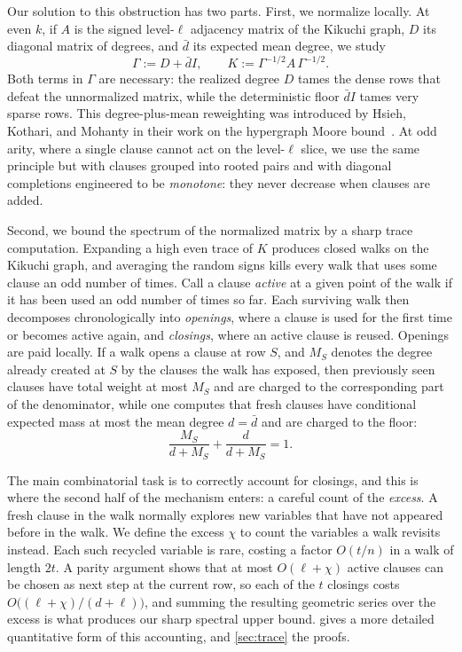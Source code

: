 \documentclass[11pt]{article}
\theoremstyle{definition}
\theoremstyle{remark}
\newcommand{\1}{\mathbf 1}
\newcommand{\bd}{\bar d}
\numberwithin{equation}{section}
\begin{document}
 Our solution to this obstruction has two
parts.  First, we normalize locally.  At even $k$, if $A$ is the signed
level-$\ell$ adjacency matrix of the Kikuchi graph, $D$ its diagonal matrix of degrees, and
$\bd$ its expected mean degree, we study
\[
 \Gamma:=D+\bd I,
 \qquad
 K:=\Gamma^{-1/2}A\,\Gamma^{-1/2}.
\]
Both terms in $\Gamma$ are necessary: the realized degree $D$ tames the
dense rows that defeat the unnormalized matrix, while the deterministic
floor $\bd I$ tames very sparse rows.  This
degree-plus-mean reweighting was introduced by Hsieh, Kothari, and
Mohanty in their work on the hypergraph Moore bound~\cite{HKM}.  At odd arity, where a single clause cannot act
on the level-$\ell$ slice, we use the same principle but with clauses
grouped into rooted pairs and with diagonal completions engineered to be
\emph{monotone}: they never decrease when clauses are added.

Second, we bound the spectrum of the normalized matrix by a sharp trace
computation.
Expanding a high even trace of $K$ produces closed walks on the Kikuchi
graph, and averaging the random signs kills every walk that uses some
clause an odd number of times.  Call a clause \emph{active} at a given
point of the walk if it has been used an odd number of times so far.
Each surviving walk then decomposes chronologically into
\emph{openings}, where a clause is used for the first time or becomes
active again, and \emph{closings}, where an active clause is reused.
Openings are paid locally.  If a walk opens a clause at row $S$, and
$M_S$ denotes the degree already created at $S$ by the clauses the walk
has exposed, then previously seen clauses have total weight at most
$M_S$ and are charged to the corresponding part of the denominator,
while one computes that fresh clauses have conditional expected mass at
most the mean degree $d=\bd$ and are charged to the floor:
\begin{equation}\label{eq:opening-identity}
 \frac{M_S}{d+M_S}+\frac{d}{d+M_S}=1.
\end{equation}

The main combinatorial task is to correctly account for closings, and this is where the second half of
the mechanism enters: a careful count of the \emph{excess}.  A fresh
clause in the walk normally explores new variables that have not appeared before in the walk. We define the excess $\chi$ to count the
variables a walk revisits instead. Each such recycled variable is
rare, costing a factor $O(t/n)$ in a walk of length $2t$.  A parity
argument shows that at most $O(\ell+\chi)$ active clauses can be chosen as next step
at the current row, so each of the $t$ closings costs
$O\bigl((\ell+\chi)/(d+\ell)\bigr)$, and summing the resulting
geometric series over the excess is what produces our sharp spectral upper bound.
 gives a more detailed quantitative form of this accounting,
and \cref{sec:trace} the proofs.
\end{document}
